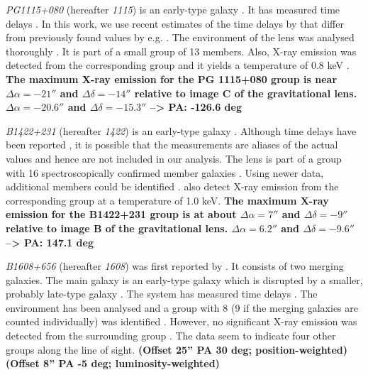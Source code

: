 \documentclass[useAMS,usenatbib]{mn2e}
\begin{document}
\textit{PG1115+080} (hereafter \textit{1115}) is an early-type galaxy \citep{1980Natur.285..641W,2005ApJ...626...51Y}. It has measured time delays \citep[see e.g.][]{1997ApJ...475L..85S}. In this work, we use recent estimates of the time delays by \citet{2010MNRAS.406.2764T} that differ from previously found values by e.g. \citet{1997ApJ...489...21B}. The environment of the lens was analysed thoroughly \citep{2006ApJ...641..169M,2011ApJ...726...84W}. It is part of a small group of 13 members. Also, X-ray emission was detected from the corresponding group and it yields a temperature of 0.8 keV \citep{2004ApJ...610..686G}.
\textbf{The maximum X-ray emission for the PG 1115+080 group is near $\Delta\alpha = -21''$ and $\Delta\delta = -14''$ relative to image C of the gravitational lens. $\Delta\alpha = -20.6''$ and $\Delta\delta = -15.3''$ --> PA: -126.6 deg}

\textit{B1422+231} (hereafter \textit{1422}) is an early-type galaxy \citep{1992MNRAS.259P...1P,1994AJ....107...28Y}. Although time delays have been reported \citep{2001MNRAS.326.1403P}, it is possible that the measurements are aliases of the actual values \citep{2003AJ....126...29R} and hence are not included in our analysis. The lens is part of a group with 16 spectroscopically confirmed member galaxies \citep{2006ApJ...641..169M}. Using newer data, additional members could be identified \citep{2011ApJ...726...84W}. \citet{2004ApJ...610..686G} also detect X-ray emission from the corresponding group at a temperature of 1.0 keV.
\textbf{The maximum X-ray emission for the B1422+231 group is at about  $\Delta\alpha = 7''$ and  $\Delta\delta = -9''$ relative to image B of the gravitational lens. $\Delta\alpha = 6.2''$ and $\Delta\delta = -9.6''$ --> PA: 147.1 deg}

\textit{B1608+656} (hereafter \textit{1608}) was first reported by \citet{1995ApJ...447L...5M}. It consists of two merging galaxies. The main galaxy is an early-type galaxy which is disrupted by a smaller, probably late-type galaxy \citep{2003ApJ...584..100S}. The system has measured time delays \citep{2002ApJ...581..823F}. The environment has been analysed and a group with 8 (9 if the merging galaxies are counted individually) was identified \citep{2006ApJ...642...30F}. However, no significant X-ray emission was detected from the surrounding group \citep{2005ApJ...625..633D}. The data seem to indicate four other groups along the line of sight.
\textbf{(Offset 25'' PA 30 deg; position-weighted) (Offset 8'' PA -5 deg; luminosity-weighted)}
\end{document}
